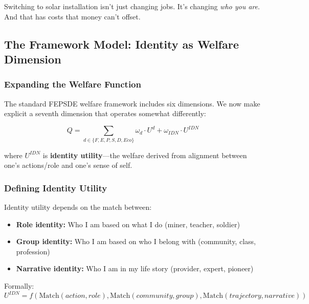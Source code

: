 Switching to solar installation isn't just changing jobs. It's changing 
\emph{who you are}. And that has costs that money can't offset.

\subsection{The Framework Model: Identity as Welfare Dimension}

\subsubsection{Expanding the Welfare Function}

The standard FEPSDE welfare framework includes six dimensions. We now 
make explicit a seventh dimension that operates somewhat differently:

\begin{equation}
Q = \sum_{d \in \{F, E, P, S, D, Eco\}} \omega_d \cdot U^d + \omega_{IDN} \cdot U^{IDN}
\label{eq:welfare-identity}
\end{equation}

where $U^{IDN}$ is \textbf{identity utility}---the welfare derived from 
alignment between one's actions/role and one's sense of self.

\subsubsection{Defining Identity Utility}

Identity utility depends on the match between:
\begin{itemize}
    \item \textbf{Role identity:} Who I am based on what I do (miner, teacher, soldier)
    \item \textbf{Group identity:} Who I am based on who I belong with (community, class, profession)
    \item \textbf{Narrative identity:} Who I am in my life story (provider, expert, pioneer)
\end{itemize}

Formally:
\begin{equation}
U^{IDN} = f\left(\text{Match}(action, role), \text{Match}(community, group), \text{Match}(trajectory, narrative)\right)
\label{eq:identity-components}
\end{equation}

